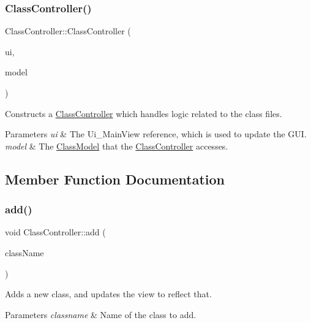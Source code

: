 \subsubsection{\texorpdfstring{Class\+Controller()}{ClassController()}}
{\footnotesize\ttfamily Class\+Controller\+::\+Class\+Controller (\begin{DoxyParamCaption}\item[{const Ui\+\_\+\+Main\+View \&}]{ui,  }\item[{const \hyperlink{classClassModel}{Class\+Model} \&}]{model }\end{DoxyParamCaption})}



Constructs a \hyperlink{classClassController}{Class\+Controller} which handles logic related to the class files. 


\begin{DoxyParams}{Parameters}
{\em ui} & The Ui\+\_\+\+Main\+View reference, which is used to update the G\+UI. \\
\hline
{\em model} & The \hyperlink{classClassModel}{Class\+Model} that the \hyperlink{classClassController}{Class\+Controller} accesses. \\
\hline
\end{DoxyParams}


\subsection{Member Function Documentation}
\mbox{\label{classClassController_abd51fbe1d80458b68f2023742bb2723a}} 
\subsubsection{\texorpdfstring{add()}{add()}}
{\footnotesize\ttfamily void Class\+Controller\+::add (\begin{DoxyParamCaption}\item[{const Q\+String \&}]{class\+Name }\end{DoxyParamCaption})}



Adds a new class, and updates the view to reflect that. 


\begin{DoxyParams}{Parameters}
{\em classname} & Name of the class to add. \\
\hline
\end{DoxyParams}
\mbox{\label{classClassController_ac8d209c4e52899c11020f6a3b35f6416}} 
